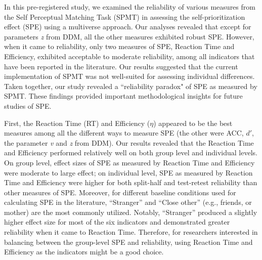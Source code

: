 \documentclass[sn-apa]{sn-jnl}%
\theoremstyle{thmstyleone}%
\theoremstyle{thmstyletwo}%
\theoremstyle{thmstylethree}%
\begin{document}
In this pre-registered study, we examined the reliability of various measures from the Self Perceptual Matching Task (SPMT) in assessing the self-prioritization effect (SPE) using a multiverse approach. Our analyses revealed that except for parameters \textit{z} from DDM, all the other measures exhibited robust SPE. However, when it came to reliability, only two measures of SPE, Reaction Time and Efficiency, exhibited acceptable to moderate reliability, among all indicators that have been reported in the literature. Our results suggested that the current implementation of SPMT was not well-suited for assessing individual differences. Taken together, our study revealed a ``reliability paradox" of SPE as measured by SPMT. These findings provided important methodological insights for future studies of SPE.

First, the Reaction Time (RT) and Efficiency ($\eta$) appeared to be the best measures among all the different ways to measure SPE (the other were ACC, $d'$, the parameter \textit{v} and \textit{z} from DDM). Our results revealed that the Reaction Time and Efficiency performed relatively well on both group level and individual levels. On group level, effect sizes of SPE as measured by Reaction Time and Efficiency were moderate to large effect; on individual level, SPE as measured by Reaction Time and Efficiency were higher for both split-half and test-retest reliability than other measures of SPE. Moreover, for different baseline conditions used for calculating SPE in the literature, ``Stranger” and ``Close other” (e.g., friends, or mother) are the most commonly utilized. Notably, ``Stranger” produced a slightly higher effect size for most of the six indicators and demonstrated greater reliability when it came to Reaction Time. Therefore, for researchers interested in balancing between the group-level SPE and reliability, using Reaction Time and Efficiency as the indicators might be a good choice. 
\end{document}
